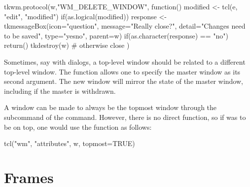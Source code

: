 \begin{Schunk}
\begin{Sinput}
 tkwm.protocol(w,"WM_DELETE_WINDOW", function() {
   modified <- tcl(e, "edit", "modified")
   if(as.logical(modified)) {
     response <- 
       tkmessageBox(icon="question",
                    message="Really close?",
                    detail="Changes need to be saved",
                    type="yesno",
                    parent=w)
     if(as.character(response) == "no")
       return()
   }
   tkdestroy(w)                          # otherwise close
 })
\end{Sinput}
\end{Schunk}

Sometimes, say with dialogs, a top-level window should be related to
a different top-level window. The function 
allows one to specify the master window as its second argument. The
new window will mirror the state of the master window, including if
the master is withdrawn.


A window can be made to always be the topmost window through the
 subcommand of the  command. However, there
is no direct  function, so if  was to be on top, one would use the 
function as follows: 
\begin{Schunk}
\begin{Sinput}
tcl("wm", "attributes", w, topmost=TRUE)  
\end{Sinput}
\end{Schunk}



\section{Frames}
\label{sec:tcltk:frames}

